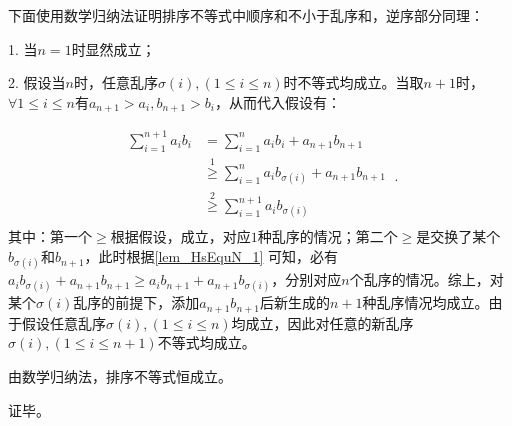 下面使用数学归纳法证明排序不等式中顺序和不小于乱序和，逆序部分同理：

1. 当$n=1$时显然成立；

2. 假设当$n$时，任意乱序$\sigma(i),(1\leq i\leq n)$时不等式均成立。当取$n+1$时，$\forall 1\leq i\leq n$有$a_{n+1}>a_i,b_{n+1}>b_i$，从而代入假设有：

\begin{equation}
\begin{split}
\sum_{i=1}^{n+1} a_i b_i&=\sum_{i=1}^n a_i b_i+a_{n+1}b_{n+1}\\
&\overset{\mathrm{1}}{\geq} \sum_{i=1}^n a_i b_{\sigma(i)} +a_{n+1}b_{n+1} \\ 
&\overset{\mathrm{2}}{\geq} \sum_{i=1}^{n+1} a_i b_{\sigma(i)} \\
\end{split}~.
\end{equation}
其中：第一个$\geq$根据假设，成立，对应$1$种乱序的情况；第二个$\geq$是交换了某个$b_{\sigma(i)}$和$b_{n+1}$，此时根据\autoref{lem_HsEquN_1} 可知，必有$a_i b_{\sigma(i)}+a_{n+1}b_{n+1}\geq a_ib_{n+1} +a_{n+1}b_{\sigma(i)}$，分别对应$n$个乱序的情况。综上，对某个$\sigma(i)$乱序的前提下，添加$a_{n+1}b_{n+1}$后新生成的$n+1$种乱序情况均成立。由于假设任意乱序$\sigma(i),(1\leq i\leq n)$均成立，因此对任意的新乱序$\sigma(i),(1\leq i\leq n+1)$不等式均成立。

由数学归纳法，排序不等式恒成立。

证毕。

